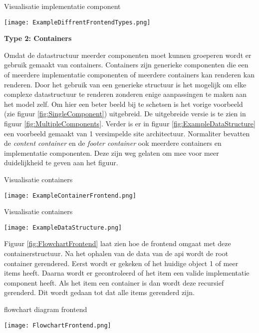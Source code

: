 \begin{graphic}
    \captionsetup{type=figure}
    \caption{Visualisatie implementatie component}
    \texttt{[image: ExampleDiffrentFrontendTypes.png]}
    \label{fig:SingleComponent}
\end{graphic}

\whitespace[2]
\textbf{Type 2: Containers}

\whitespace
Omdat de datastructuur meerder componenten moet kunnen groeperen wordt er gebruik gemaakt van containers.
Containers zijn generieke componenten die een of meerdere implementatie componenten of meerdere containers kan renderen kan renderen.
Door het gebruik van een generieke structuur is het mogelijk om elke complexe datastructuur te renderen zonderen enige aanpassingen te maken aan het model zelf.
%
%
Om hier een beter beeld bij te schetsen is het vorige voorbeeld (zie figuur \ref{fig:SingleComponent}) uitgebreid.
De uitgebreide versie is te zien in figuur \ref{fig:MultipleComponents}.
Verder is er in figuur \ref{fig:ExampleDataStructure} een voorbeeld gemaakt van 1 versimpelde site architectuur.
Normaliter bevatten de \textit{content container} en de \textit{footer container} ook meerdere containers en implementatie componenten.
Deze zijn weg gelaten om mee voor meer duidelijkheid te geven aan het figuur.

\whitespace
\begin{graphic}
    \captionsetup{type=figure}
    \caption{Visualisatie containers}
    \texttt{[image: ExampleContainerFrontend.png]}
    \label{fig:MultipleComponents}
\end{graphic}

\newpage
\whitespace
\begin{graphic}
    \captionsetup{type=figure}
    \caption{Visualisatie containers}
    \texttt{[image: ExampleDataStructure.png]}
    \label{fig:ExampleDataStructure}
\end{graphic}

\whitespace
Figuur \ref{fig:FlowchartFrontend} laat zien hoe de frontend omgaat met deze containerstructuur.
Na het ophalen van de data van de api wordt de root container gerendered.
Eerst wordt er gekeken of het huidige object 1 of meer items heeft.
Daarna wordt er gecontroleerd of het item een valide implementatie component heeft.
Als het item een container is dan wordt deze recursief gerenderd.
Dit wordt gedaan tot dat alle items gerenderd zijn.

\whitespace
\begin{graphic}
    \captionsetup{type=figure}
    \caption{flowchart diagram frontend}
    \texttt{[image: FlowchartFrontend.png]}
    \label{fig:FlowchartFrontend}
\end{graphic}
